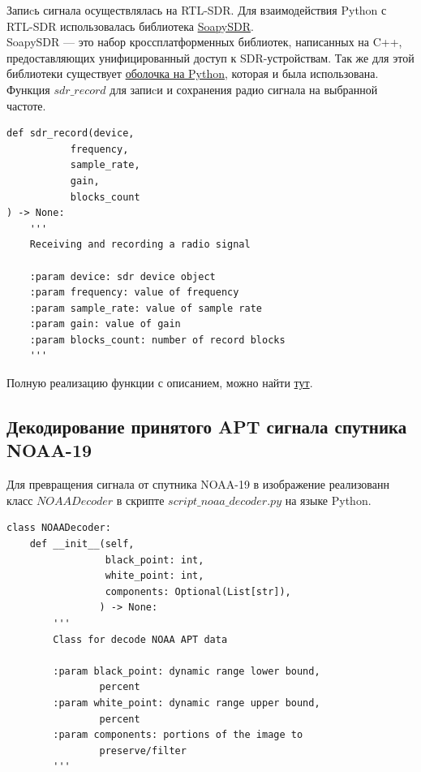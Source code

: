 \documentclass[a4paper, 14pt, titlepage, fleqn]{extarticle}
\begin{document}
	 \noindent Запиcь сигнала осуществлялась на RTL-SDR. Для взаимодействия Python с RTL-SDR использовалась библиотека \href{https://github.com/pothosware/SoapySDR/wiki}{SoapySDR}. \\ 
	
	\noindent SoapySDR — это набор кроссплатформенных библиотек, написанных на C++, предоставляющих унифицированный доступ к SDR-устройствам. Так же для этой библиотеки существует \href{https://github.com/pothosware/SoapySDR/wiki/PythonSupport}{оболочка на Python}, которая и была использована. \\
	
	\noindent Функция $sdr\_record$ для запиcи и сохранения радио сигнала на выбранной частоте.
	
	\begin{verbatim}
def sdr_record(device,
	       frequency,
	       sample_rate,
	       gain,
	       blocks_count
) -> None:
    '''
    Receiving and recording a radio signal

    :param device: sdr device object
    :param frequency: value of frequency
    :param sample_rate: value of sample rate
    :param gain: value of gain
    :param blocks_count: number of record blocks 
    '''
	\end{verbatim}
	
	\noindent Полную реализацию функции с описанием, можно найти \href{https://github.com/kitfloppa/sdr-sat-receiving/blob/main/script_noaa_data_receiver.py#L92}{тут}. \\
	
	\pagebreak
	\subsection*{Декодирование принятого APT сигнала спутника NOAA-19}
	
	Для превращения сигнала от спутника NOAA-19 в изображение реализованн класс $NOAADecoder$ в скрипте $script\_noaa\_decoder.py$ на языке Python.
	
	\begin{verbatim}
class NOAADecoder:
    def __init__(self,
                 black_point: int,
                 white_point: int,
                 components: Optional(List[str]),
                ) -> None:
        '''
        Class for decode NOAA APT data

        :param black_point: dynamic range lower bound, 
        		percent
        :param white_point: dynamic range upper bound, 
        		percent
        :param components: portions of the image to 
        		preserve/filter
        '''
	\end{verbatim}
\end{document}
